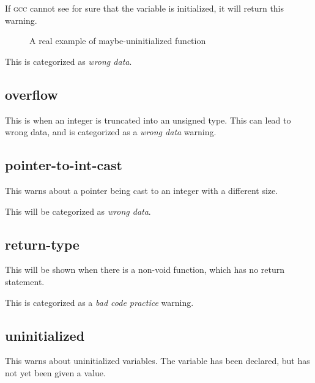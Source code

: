 \documentclass[a4paper,11pt]{report}
\newcommand{\figa}{
    \begin{figure}[!htpb]
    \centering
}
\newcommand{\figb}[2]{
    \caption{#1}
    \label{#2}
    \end{figure}
}
\begin{document}
If \textsc{gcc} cannot see for sure that the variable is initialized, it will 
return this warning.

\figa
    \subfigure{
        
    }
\figb{A real example of maybe-uninitialized function}{lst:maybeuninitializedreal}

This is categorized as \emph{wrong data}.


            \subsection*{overflow}
This is when an integer is truncated into an unsigned type. This can lead to 
wrong data, and is categorized as a \emph{wrong data} warning.


            \subsection*{pointer-to-int-cast}
This warns about a pointer being cast to an integer with a different size.

This will be categorized as \emph{wrong data}.


            \subsection*{return-type}
This will be shown when there is a non-void function, which has no return 
statement.

This is categorized as a \emph{bad code practice} warning.


            %

            \subsection*{uninitialized}
This warns about uninitialized variables. The variable has been declared, but 
has not yet been given a value.
\end{document}
